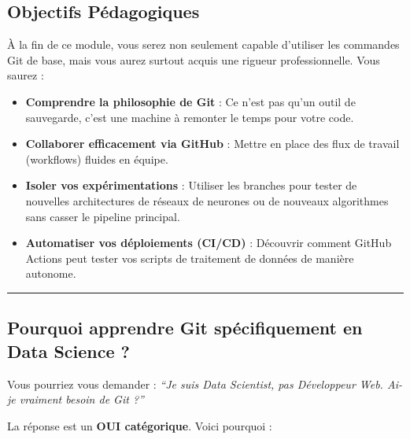 \documentclass[
  letterpaper,
  DIV=11,
  numbers=noendperiod]{scrreprt}
\providecommand{\tightlist}{%
  \setlength{\itemsep}{0pt}\setlength{\parskip}{0pt}}
\begin{document}
\subsection{Objectifs Pédagogiques}\label{objectifs-puxe9dagogiques}

À la fin de ce module, vous serez non seulement capable d'utiliser les
commandes Git de base, mais vous aurez surtout acquis une rigueur
professionnelle. Vous saurez :

\begin{itemize}
\tightlist
\item
  \textbf{Comprendre la philosophie de Git} : Ce n'est pas qu'un outil
  de sauvegarde, c'est une machine à remonter le temps pour votre code.
\item
  \textbf{Collaborer efficacement via GitHub} : Mettre en place des flux
  de travail (workflows) fluides en équipe.
\item
  \textbf{Isoler vos expérimentations} : Utiliser les branches pour
  tester de nouvelles architectures de réseaux de neurones ou de
  nouveaux algorithmes sans casser le pipeline principal.
\item
  \textbf{Automatiser vos déploiements (CI/CD)} : Découvrir comment
  GitHub Actions peut tester vos scripts de traitement de données de
  manière autonome.
\end{itemize}

\begin{center}\rule{0.5\linewidth}{0.5pt}\end{center}

\subsection{Pourquoi apprendre Git spécifiquement en Data Science
?}\label{pourquoi-apprendre-git-spuxe9cifiquement-en-data-science}

Vous pourriez vous demander : \emph{``Je suis Data Scientist, pas
Développeur Web. Ai-je vraiment besoin de Git ?''}

La réponse est un \textbf{OUI catégorique}. Voici pourquoi :
\end{document}
